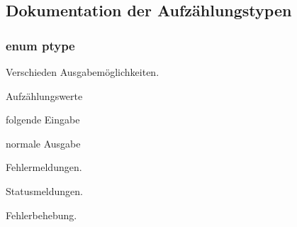 \subsection{Dokumentation der Aufzählungstypen}
\subsubsection[{\texorpdfstring{ptype}{ptype}}]{\setlength{\rightskip}{0pt plus 5cm}enum {\bf ptype}}\hypertarget{group___lend_lib_out_ga0916607956575302a93dbd21440edc1a}{}\label{group___lend_lib_out_ga0916607956575302a93dbd21440edc1a}


Verschieden Ausgabemöglichkeiten. 

\begin{Desc}
\item[Aufzählungswerte]\par
\begin{description}
\item[{\em 
in\hypertarget{group___lend_lib_out_gga0916607956575302a93dbd21440edc1aa9e70047869d00c5afd8c68af325e48d7}{}\label{group___lend_lib_out_gga0916607956575302a93dbd21440edc1aa9e70047869d00c5afd8c68af325e48d7}
}]folgende Eingabe \item[{\em 
out\hypertarget{group___lend_lib_out_gga0916607956575302a93dbd21440edc1aaaca14bf8f96bb2b357f12496b7f11579}{}\label{group___lend_lib_out_gga0916607956575302a93dbd21440edc1aaaca14bf8f96bb2b357f12496b7f11579}
}]normale Ausgabe \item[{\em 
error\hypertarget{group___lend_lib_out_gga0916607956575302a93dbd21440edc1aad606e435413ea0944dd00d49e901e4ed}{}\label{group___lend_lib_out_gga0916607956575302a93dbd21440edc1aad606e435413ea0944dd00d49e901e4ed}
}]Fehlermeldungen. \item[{\em 
status\hypertarget{group___lend_lib_out_gga0916607956575302a93dbd21440edc1aa9a6940c3bba41cdd6dacae1a00176a30}{}\label{group___lend_lib_out_gga0916607956575302a93dbd21440edc1aa9a6940c3bba41cdd6dacae1a00176a30}
}]Statusmeldungen. \item[{\em 
extra\hypertarget{group___lend_lib_out_gga0916607956575302a93dbd21440edc1aa6884b538ac6996bddc51afddcb815e31}{}\label{group___lend_lib_out_gga0916607956575302a93dbd21440edc1aa6884b538ac6996bddc51afddcb815e31}
}]Fehlerbehebung. \end{description}
\end{Desc}


